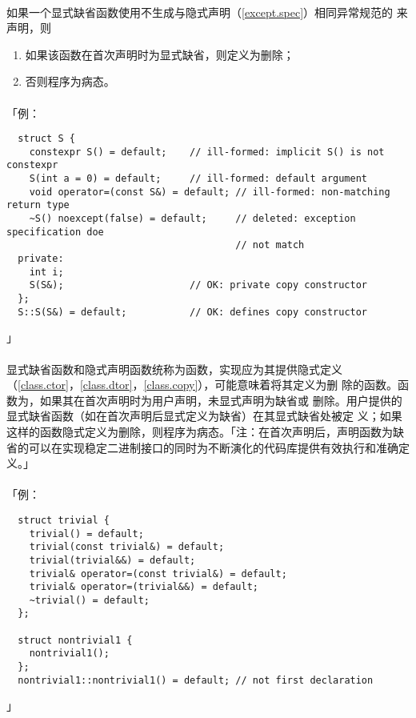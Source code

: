 \paragraph{}
如果一个显式缺省函数使用不生成与隐式声明（\ref{except.spec}）相同异常规范的
来声明，则
\begin{enumerate}
  \item{如果该函数在首次声明时为显式缺省，则定义为删除；}
  \item{否则程序为病态。}
\end{enumerate}

\paragraph{}
「例：
\begin{lstlisting}
  struct S {
    constexpr S() = default;    // ill-formed: implicit S() is not constexpr
    S(int a = 0) = default;     // ill-formed: default argument
    void operator=(const S&) = default; // ill-formed: non-matching return type
    ~S() noexcept(false) = default;     // deleted: exception specification doe
                                        // not match
  private:
    int i;
    S(S&);                      // OK: private copy constructor
  };
  S::S(S&) = default;           // OK: defines copy constructor
\end{lstlisting}」

\paragraph{}
显式缺省函数和隐式声明函数统称为函数，实现应为其提供隐式定义
（\ref{class.ctor}，\ref{class.dtor}，\ref{class.copy}），可能意味着将其定义为删
除的函数。函数为，如果其在首次声明时为用户声明，未显式声明为缺省或
删除。用户提供的显式缺省函数（如在首次声明后显式定义为缺省）在其显式缺省处被定
义；如果这样的函数隐式定义为删除，则程序为病态。「注：在首次声明后，声明函数为缺
省的可以在实现稳定二进制接口的同时为不断演化的代码库提供有效执行和准确定义。」

\paragraph{}
「例：
\begin{lstlisting}
  struct trivial {
    trivial() = default;
    trivial(const trivial&) = default;
    trivial(trivial&&) = default;
    trivial& operator=(const trivial&) = default;
    trivial& operator=(trivial&&) = default;
    ~trivial() = default;
  };

  struct nontrivial1 {
    nontrivial1();
  };
  nontrivial1::nontrivial1() = default; // not first declaration
\end{lstlisting}」

